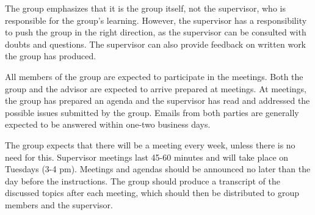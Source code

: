 \documentclass[../ProjectFoundation.tex]{subfiles}
\begin{document}
The group emphasizes that it is the group itself, not the supervisor, who is responsible for the group's learning. However, the supervisor has a responsibility to push the group in the right direction, as the supervisor can be consulted with doubts and questions. The supervisor can also provide feedback on written work the group has produced.

All members of the group are expected to participate in the meetings. Both the group and the advisor are expected to arrive prepared at meetings. At meetings, the group has prepared an agenda and the supervisor has read and addressed the possible issues submitted by the group.
Emails from both parties are generally expected to be answered within one-two business days.

The group expects that there will be a meeting every week, unless there is no need for this. Supervisor meetings last 45-60 minutes and will take place on Tuesdays (3-4 pm). Meetings and agendas should be announced no later than the day before the instructions. The group should produce a transcript of the discussed topics after each meeting, which should then be distributed to group members and the supervisor.
\end{document}
